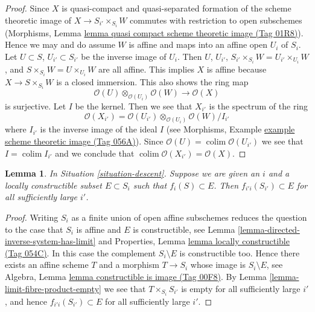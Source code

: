 \documentclass{amsart}
\theoremstyle{plain}
\newtheorem{lemma}[subsection]{Lemma}
\theoremstyle{definition}
\theoremstyle{remark}
\numberwithin{equation}{subsection}
\def\colim{\mathop{\mathrm{colim}}\nolimits}
\begin{document}
\begin{proof}
Since $X$ is quasi-compact and quasi-separated formation of the
scheme theoretic image of $X \to S_{i'} \times_{S_i} W$
commutes with restriction to open subschemes
(Morphisms, Lemma \href{https://stacks.math.columbia.edu/tag/01R8}{lemma quasi compact scheme theoretic image (Tag 01R8)}).
Hence we may and do assume $W$ is affine and maps into an affine open
$U_i$ of $S_i$. Let $U \subset S$, $U_{i'} \subset S_{i'}$
be the inverse image of $U_i$. Then $U$, $U_{i'}$, 
$S_{i'} \times_{S_i} W = U_{i'} \times_{U_i} W$, and
$S \times_{S_i} W = U \times_{U_i} W$ are all affine.
This implies $X$ is affine because $X \to S \times_{S_i} W$ is
a closed immersion. This also shows the ring map
$$
\mathcal{O}(U) \otimes_{\mathcal{O}(U_i)} \mathcal{O}(W) \to
\mathcal{O}(X)
$$
is surjective. Let $I$ be the kernel. Then we see that $X_{i'}$
is the spectrum of the ring
$$
\mathcal{O}(X_{i'}) =
\mathcal{O}(U_{i'}) \otimes_{\mathcal{O}(U_i)} \mathcal{O}(W)/I_{i'}
$$
where $I_{i'}$ is the inverse image of the ideal $I$ (see
Morphisms, Example \href{https://stacks.math.columbia.edu/tag/056A}{example scheme theoretic image (Tag 056A)}).
Since $\mathcal{O}(U) = \colim \mathcal{O}(U_{i'})$
we see that $I = \colim I_{i'}$ and we conclude
that $\colim \mathcal{O}(X_{i'}) = \mathcal{O}(X)$.
\end{proof}


\begin{lemma}
\label{lemma-limit-contained-in-constructible}
In Situation \ref{situation-descent}.
Suppose we are given an $i$ and a locally constructible subset
$E \subset S_i$ such that $f_i(S) \subset E$.
Then $f_{i'i}(S_{i'}) \subset E$ for all sufficiently large $i'$.
\end{lemma}

\begin{proof}
Writing $S_i$ as a finite union of open affine subschemes reduces
the question to the case that $S_i$ is affine and $E$ is constructible, see
Lemma \ref{lemma-directed-inverse-system-has-limit}
and
Properties, Lemma \href{https://stacks.math.columbia.edu/tag/054C}{lemma locally constructible (Tag 054C)}.
In this case the complement $S_i \setminus E$ is constructible too.
Hence there exists an affine scheme $T$ and a morphism $T \to S_i$
whose image is $S_i \setminus E$, see
Algebra, Lemma \href{https://stacks.math.columbia.edu/tag/00F8}{lemma constructible is image (Tag 00F8)}.
By
Lemma \ref{lemma-limit-fibre-product-empty}
we see that $T \times_{S_i} S_{i'}$ is empty for all sufficiently large
$i'$, and hence $f_{i'i}(S_{i'}) \subset E$ for all sufficiently large $i'$.
\end{proof}
\end{document}
